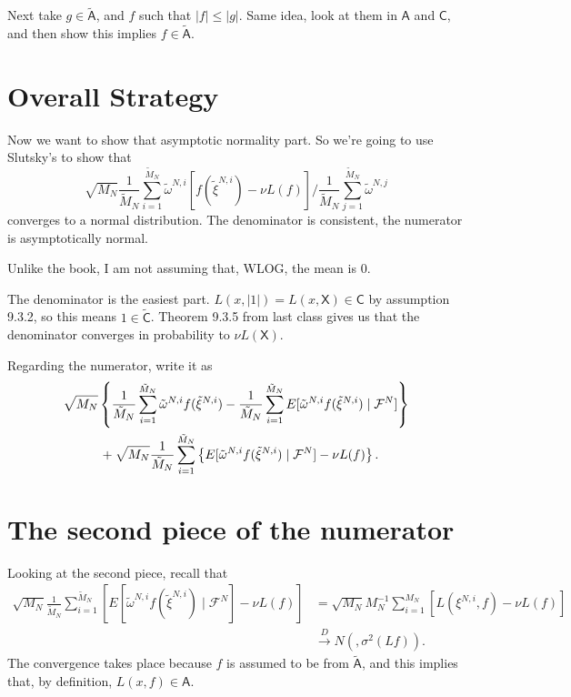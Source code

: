 \documentclass{article}
\begin{document}
Next take $g \in \tilde{\mathsf{A}}$, and $f$ such that $|f|\le |g|$. Same idea, look at them in $\mathsf{A}$ and $\mathsf{C}$, and then show this implies $f \in \tilde{\mathsf{A}}$.

\section{Overall Strategy}

Now we want to show that asymptotic normality part. So we're going to use Slutsky's to show that
$$
\sqrt{M_N} \frac{1}{\tilde{M}_N} \sum_{i=1}^{\tilde{M}_N} \tilde{\omega}^{N,i}\left[ f(\tilde{\xi}^{N,i}) - \nu L(f) \right]
\bigg/ \frac{1}{\tilde{M}_N} \sum_{j=1}^{\tilde{M}_N} \tilde{\omega}^{N,j}
$$
converges to a normal distribution. The denominator is consistent, the numerator is asymptotically normal.

Unlike the book, I am not assuming that, WLOG, the mean is $0$.

The denominator is the easiest part. $L(x, |1|) = L(x,\mathsf{X}) \in \mathsf{C}$ by assumption 9.3.2, so this means $1 \in \tilde{\mathsf{C}}$. Theorem 9.3.5 from last class gives us that the denominator converges in probability to $\nu L(\mathsf{X})$.

Regarding the numerator, write it as 
\begin{align*}
&\sqrt{M_N}\left\{  \frac{1}{\tilde{M}_N} \sum_{i=1}^{\tilde{M}_N} \tilde{\omega}^{N,i} f(\tilde{\xi}^{N,i}) -  \frac{1}{\tilde{M}_N} \sum_{i=1}^{\tilde{M}_N} E[ \tilde{\omega}^{N,i} f(\tilde{\xi}^{N,i}) \mid \mathcal{F}^N] \right\} \\
& \hspace{10mm} + \sqrt{M_N} \frac{1}{\tilde{M}_N} \sum_{i=1}^{\tilde{M}_N} \left\{ E[ \tilde{\omega}^{N,i} f(\tilde{\xi}^{N,i}) \mid \mathcal{F}^N] - \nu L(f) \right\}.
\end{align*}


\section{The second piece of the numerator}

Looking at the second piece, recall that 
\begin{align*}
\sqrt{M_N} \frac{1}{\tilde{M}_N} \sum_{i=1}^{\tilde{M}_N} \left[ E[ \tilde{\omega}^{N,i} f(\tilde{\xi}^{N,i}) \mid \mathcal{F}^N] - \nu L(f) \right]
&= \sqrt{M_N}  M_N^{-1} \sum_{i=1}^{M_N}  \left[ L(\xi^{N,i},f) - \nu L(f)\right]\\ &\overset{D}{\to} N( , \sigma^2(Lf)) .
\end{align*}
The convergence takes place because $f$ is assumed to be from $\tilde{\mathsf{A}}$, and this implies that, by definition, $L(x,f) \in \mathsf{A}$. 
\end{document}
